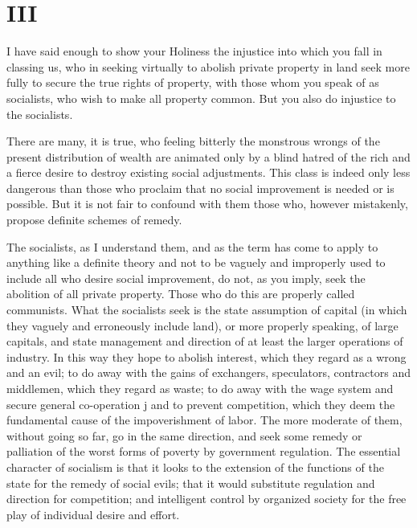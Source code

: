 \documentclass{book}
\begin{document}
\chapter*{III}
\label{chapter-3}
I have said enough to show your Holiness the injustice into which you fall in classing us, who in seeking virtually to abolish private property in land seek more fully to secure the true rights of property, with those whom you speak of as socialists, who wish to make all property common. But you also do injustice to the socialists.

There are many, it is true, who feeling bitterly the monstrous wrongs of the present distribution of wealth are animated only by a blind hatred of the rich and a fierce desire to destroy existing social adjustments. This class is indeed only less dangerous than those who proclaim that no social improvement is needed or is possible. But it is not fair to confound with them those who, however mistakenly, propose definite schemes of remedy.

The socialists, as I understand them, and as the term has come to apply to anything like a definite theory and not to be vaguely and improperly used to include all who desire social improvement, do not, as you imply, seek the abolition of all private property. Those who do this are properly called communists. What the socialists seek is the state assumption of capital (in which they vaguely and erroneously include land), or more properly speaking, of large capitals, and state management and direction of at least the larger operations of industry. In this way they hope to abolish interest, which they regard as a wrong and an evil; to do away with the gains of exchangers, speculators, contractors and middlemen, which they regard as waste; to do away with the wage system and secure general co-operation j and to prevent competition, which they deem the fundamental cause of the impoverishment of labor. The more moderate of them, without going so far, go in the same direction, and seek some remedy or palliation of the worst forms of poverty by government regulation. The essential character of socialism is that it looks to the extension of the functions of the state for the remedy of social evils; that it would substitute regulation and direction for competition; and intelligent control by organized society for the free play of individual desire and effort.
\end{document}

